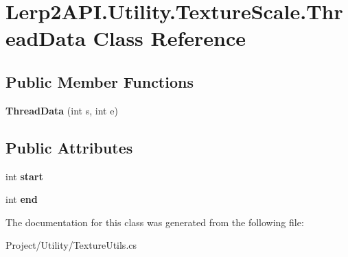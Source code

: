 \hypertarget{class_lerp2_a_p_i_1_1_utility_1_1_texture_scale_1_1_thread_data}{}\section{Lerp2\+A\+P\+I.\+Utility.\+Texture\+Scale.\+Thread\+Data Class Reference}
\label{class_lerp2_a_p_i_1_1_utility_1_1_texture_scale_1_1_thread_data}
\subsection*{Public Member Functions}
\begin{DoxyCompactItemize}
\item 
\mbox{\label{class_lerp2_a_p_i_1_1_utility_1_1_texture_scale_1_1_thread_data_acec0feaaceba3a9ed76b0d1e9b4de587}} 
{\bfseries Thread\+Data} (int s, int e)
\end{DoxyCompactItemize}
\subsection*{Public Attributes}
\begin{DoxyCompactItemize}
\item 
\mbox{\label{class_lerp2_a_p_i_1_1_utility_1_1_texture_scale_1_1_thread_data_ad328b15a0f0466dbcb2d292159a1cb26}} 
int {\bfseries start}
\item 
\mbox{\label{class_lerp2_a_p_i_1_1_utility_1_1_texture_scale_1_1_thread_data_a12ae3b2c893805120621dafee96dafbd}} 
int {\bfseries end}
\end{DoxyCompactItemize}


The documentation for this class was generated from the following file\+:\begin{DoxyCompactItemize}
\item 
Project/\+Utility/Texture\+Utils.\+cs\end{DoxyCompactItemize}
